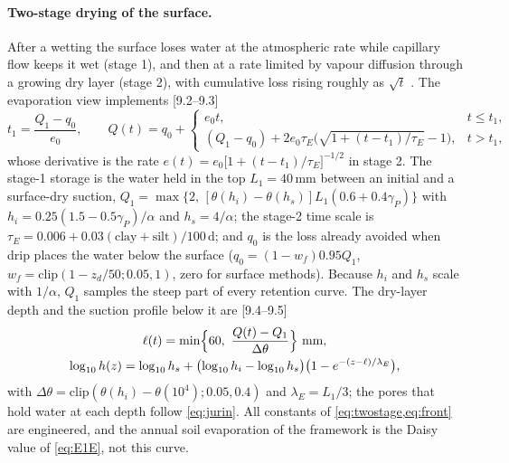 \paragraph{Two-stage drying of the surface.} After a wetting the surface loses water at the atmospheric rate while capillary flow keeps it wet (stage 1), and then at a rate limited by vapour diffusion through a growing dry layer (stage 2), with cumulative loss rising roughly as $\sqrt t$ \citep{Philip1957,Ritchie1972,Lehmann2008,Or2013}. The evaporation view implements [9.2--9.3]
\begin{equation}
t_1=\frac{Q_1-q_0}{e_0},\qquad
Q(t)=q_0+\begin{cases}e_0t, & t\le t_1,\\ (Q_1-q_0)+2e_0\tau_E\bigl(\sqrt{1+(t-t_1)/\tau_E}-1\bigr), & t>t_1,\end{cases}
\label{eq:twostage}
\end{equation}
whose derivative is the rate $e(t)=e_0\bigl[1+(t-t_1)/\tau_E\bigr]^{-1/2}$ in stage 2. The stage-1 storage is the water held in the top $L_1=40$\,mm between an initial and a surface-dry suction, $Q_1=\max\{2,\,[\theta(h_i)-\theta(h_s)]L_1(0.6+0.4\gamma_P)\}$ with $h_i=0.25(1.5-0.5\gamma_P)/\alpha$ and $h_s=4/\alpha$; the stage-2 time scale is $\tau_E=0.006+0.03(\mathrm{clay}+\mathrm{silt})/100$\,d; and $q_0$ is the loss already avoided when drip places the water below the surface ($q_0=(1-w_f)0.95Q_1$, $w_f=\mathrm{clip}(1-z_d/50;0.05,1)$, zero for surface methods). Because $h_i$ and $h_s$ scale with $1/\alpha$, $Q_1$ samples the steep part of every retention curve. The dry-layer depth and the suction profile below it are [9.4--9.5]
\begin{equation}
\begin{gathered}\ell(t)=\min\Bigl\{60,\ \frac{Q(t)-Q_1}{\Delta\theta}\Bigr\}\ \mathrm{mm},\\
\log_{10}h(z)=\log_{10}h_s+\bigl(\log_{10}h_i-\log_{10}h_s\bigr)\bigl(1-e^{-(z-\ell)/\lambda_E}\bigr),\end{gathered}
\label{eq:front}
\end{equation}
with $\Delta\theta=\mathrm{clip}(\theta(h_i)-\theta(10^4);0.05,0.4)$ and $\lambda_E=L_1/3$; the pores that hold water at each depth follow \cref{eq:jurin}. All constants of \cref{eq:twostage,eq:front} are engineered, and the annual soil evaporation of the framework is the Daisy value of \cref{eq:E1E}, not this curve.

